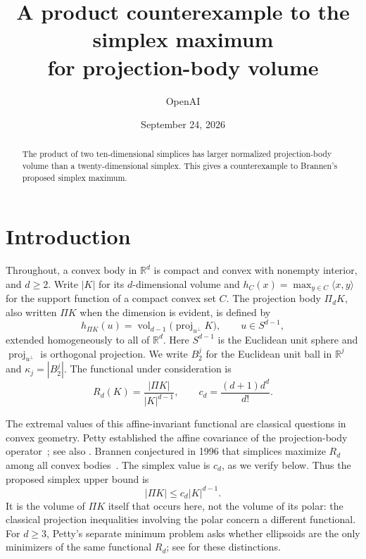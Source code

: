 \documentclass[11pt]{article}
\title{A product counterexample to the simplex maximum\\
for projection-body volume}
\author{OpenAI}
\date{September 24, 2026}
\newcommand{\R}{\mathbb R}
\DeclareMathOperator{\vol}{vol}
\DeclareMathOperator{\proj}{proj}
\begin{document}
\maketitle

\begin{abstract}
The product of two ten-dimensional simplices has larger normalized
projection-body volume than a twenty-dimensional simplex. This gives
a counterexample to Brannen's proposed simplex maximum.
\end{abstract}

\section{Introduction}

Throughout, a convex body in \(\R^d\) is compact and convex with nonempty
interior, and \(d\ge2\). Write \(|K|\) for its \(d\)-dimensional
volume and \(h_C(x)=\max_{y\in C}\langle x,y\rangle\) for the support
function of a compact convex set \(C\). The projection body
\(\Pi_d K\), also written \(\Pi K\) when the dimension is evident, is
defined by
\[
 h_{\Pi K}(u)=\vol_{d-1}\bigl(\proj_{u^\perp}K\bigr),
 \qquad u\in S^{d-1},
\]
extended homogeneously to all of \(\R^d\). Here \(S^{d-1}\) is the
Euclidean unit sphere and \(\proj_{u^\perp}\) is orthogonal projection.
We write \(B_2^j\) for the Euclidean unit ball in \(\R^j\) and
\(\kappa_j=|B_2^j|\).
The functional under consideration is
\begin{equation}\label{eq:functional}
 R_d(K)=\frac{|\Pi K|}{|K|^{d-1}},
 \qquad c_d=\frac{(d+1)d^d}{d!}.
\end{equation}

The extremal values of this affine-invariant functional are classical
questions in convex geometry. Petty established the affine covariance of
the projection-body operator~\cite{Petty}; see also
\cite[Equation~(1)]{Ludwig}. Brannen conjectured in 1996 that simplices
maximize \(R_d\) among all convex bodies~\cite{Brannen}.
The simplex value is \(c_d\), as we verify below. Thus the proposed
simplex upper bound is
\begin{equation}\label{eq:proposed-bound}
 |\Pi K|\le c_d|K|^{d-1}.
\end{equation}
It is the volume of \(\Pi K\) itself that occurs here, not the volume of
its polar: the classical projection inequalities involving the polar
concern a different functional. For \(d\ge3\), Petty's separate minimum
problem asks whether ellipsoids are the only minimizers of the same
functional \(R_d\); see \cite[Section~1]{Saroglou} for these distinctions.
\end{document}
